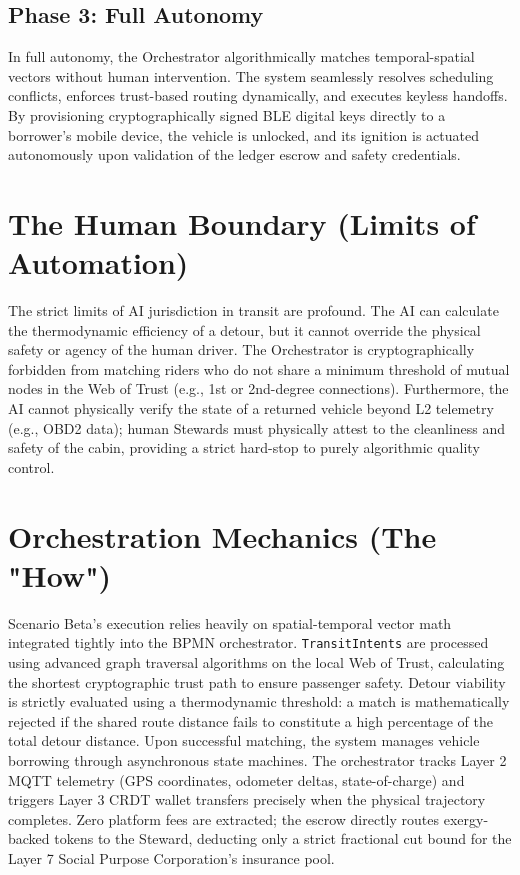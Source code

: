 \subsection{Phase 3: Full Autonomy}
In full autonomy, the Orchestrator algorithmically matches temporal-spatial vectors without human intervention. The system seamlessly resolves scheduling conflicts, enforces trust-based routing dynamically, and executes keyless handoffs. By provisioning cryptographically signed BLE digital keys directly to a borrower's mobile device, the vehicle is unlocked, and its ignition is actuated autonomously upon validation of the ledger escrow and safety credentials.

\section{The Human Boundary (Limits of Automation)}
The strict limits of AI jurisdiction in transit are profound. The AI can calculate the thermodynamic efficiency of a detour, but it cannot override the physical safety or agency of the human driver. The Orchestrator is cryptographically forbidden from matching riders who do not share a minimum threshold of mutual nodes in the Web of Trust (e.g., 1st or 2nd-degree connections). Furthermore, the AI cannot physically verify the state of a returned vehicle beyond L2 telemetry (e.g., OBD2 data); human Stewards must physically attest to the cleanliness and safety of the cabin, providing a strict hard-stop to purely algorithmic quality control.

\section{Orchestration Mechanics (The "How")}
Scenario Beta's execution relies heavily on spatial-temporal vector math integrated tightly into the BPMN orchestrator. \texttt{TransitIntents} are processed using advanced graph traversal algorithms on the local Web of Trust, calculating the shortest cryptographic trust path to ensure passenger safety. Detour viability is strictly evaluated using a thermodynamic threshold: a match is mathematically rejected if the shared route distance fails to constitute a high percentage of the total detour distance.
Upon successful matching, the system manages vehicle borrowing through asynchronous state machines. The orchestrator tracks Layer 2 MQTT telemetry (GPS coordinates, odometer deltas, state-of-charge) and triggers Layer 3 CRDT wallet transfers precisely when the physical trajectory completes. Zero platform fees are extracted; the escrow directly routes exergy-backed tokens to the Steward, deducting only a strict fractional cut bound for the Layer 7 Social Purpose Corporation's insurance pool.
